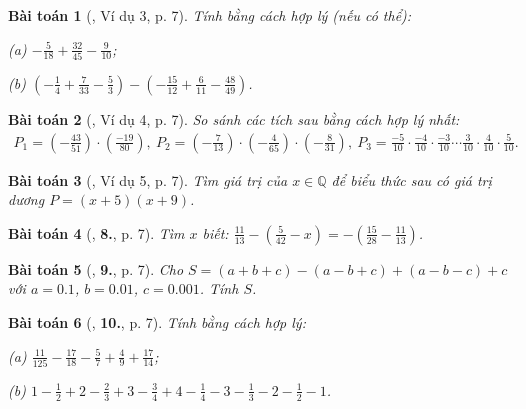 \documentclass{article}
\numberwithin{equation}{section}
\newtheorem{baitoan}{Bài toán}[section]
\begin{document}
\begin{baitoan}[\cite{Tuyen_Toan_7}, Ví dụ 3, p. 7]
	Tính bằng cách hợp lý (nếu có thể):
	\begin{enumerate*}
		\item[(a)] $-\frac{5}{18} + \frac{32}{45} - \frac{9}{10}$;
		\item[(b)] $\left(-\frac{1}{4} + \frac{7}{33} - \frac{5}{3}\right) - \left(-\frac{15}{12} + \frac{6}{11} - \frac{48}{49}\right)$.
	\end{enumerate*}
\end{baitoan}

\begin{baitoan}[\cite{Tuyen_Toan_7}, Ví dụ 4, p. 7]
	So sánh các tích sau bằng cách hợp lý nhất:
	\begin{align*}
		P_1 = \left(-\frac{43}{51}\right)\cdot\left(\frac{-19}{80}\right),\ P_2 = \left(-\frac{7}{13}\right)\cdot\left(-\frac{4}{65}\right)\cdot\left(-\frac{8}{31}\right),\ P_3 = \frac{-5}{10}\cdot\frac{-4}{10}\cdot\frac{-3}{10}\cdots\frac{3}{10}\cdot\frac{4}{10}\cdot\frac{5}{10}.
	\end{align*}
\end{baitoan}

\begin{baitoan}[\cite{Tuyen_Toan_7}, Ví dụ 5, p. 7]
	Tìm giá trị của $x\in\mathbb{Q}$ để biểu thức sau có giá trị dương  $P = (x + 5)(x + 9)$.
\end{baitoan}

\begin{baitoan}[\cite{Tuyen_Toan_7}, \textbf{8.}, p. 7]
	Tìm $x$ biết: $\frac{11}{13} - \left(\frac{5}{42} - x\right) = -\left(\frac{15}{28} - \frac{11}{13}\right)$.
\end{baitoan}

\begin{baitoan}[\cite{Tuyen_Toan_7}, \textbf{9.}, p. 7]
	Cho $S = (a + b + c) - (a - b + c) + (a - b - c) + c$ với $a = 0.1$, $b = 0.01$, $c = 0.001$. Tính $S$.
\end{baitoan}

\begin{baitoan}[\cite{Tuyen_Toan_7}, \textbf{10.}, p. 7]
	Tính bằng cách hợp lý:\\
	\begin{enumerate*}
		\item[(a)] $\frac{11}{125} - \frac{17}{18} - \frac{5}{7} + \frac{4}{9} + \frac{17}{14}$;
		\item[(b)] $1 - \frac{1}{2} + 2 - \frac{2}{3} + 3 - \frac{3}{4} + 4 - \frac{1}{4} - 3 - \frac{1}{3} - 2 - \frac{1}{2} - 1$.
	\end{enumerate*}
\end{baitoan}
\end{document}
